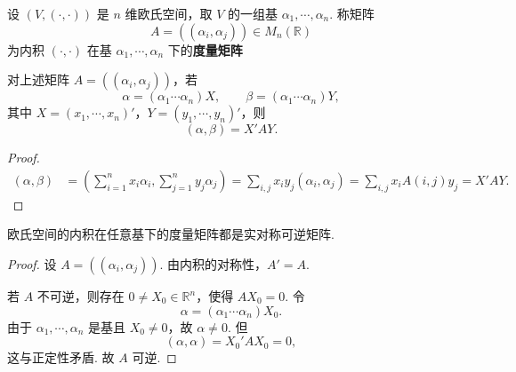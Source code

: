 \begin{definition}
	设 $(V,(\cdot,\cdot))$ 是 $n$ 维欧氏空间，取 $V$ 的一组基 $\alpha_1,\cdots,\alpha_n$. 称矩阵
	\[
	A=((\alpha_i,\alpha_j))\in M_n(\mathbb{R})
	\]
	为内积 $(\cdot,\cdot)$ 在基 $\alpha_1,\cdots,\alpha_n$ 下的\textbf{度量矩阵}
\end{definition}

\begin{lemma}
	对上述矩阵 $A=((\alpha_i,\alpha_j))$，若
	\[
	\alpha=(\alpha_1\cdots\alpha_n)X,
	\qquad
	\beta=(\alpha_1\cdots\alpha_n)Y,
	\]
	其中 $X=(x_1,\cdots,x_n)'$，$Y=(y_1,\cdots,y_n)'$，则
	\[
	(\alpha,\beta)=X'AY.
	\]
\end{lemma}
\begin{proof}

	\[
	\begin{aligned}
		(\alpha,\beta)
		&=\left(\sum_{i=1}^n x_i\alpha_i,\sum_{j=1}^n y_j\alpha_j\right)             =\sum_{i,j}x_i y_j(\alpha_i,\alpha_j)         =\sum_{i,j}x_iA(i,j)y_j=X'AY.
	\end{aligned}
	\]
\end{proof}

\begin{proposition}
	欧氏空间的内积在任意基下的度量矩阵都是实对称可逆矩阵.
\end{proposition}
\begin{proof}
	设 $A=((\alpha_i,\alpha_j))$. 由内积的对称性，$A'=A$.
	
	若 $A$ 不可逆，则存在 $0\ne X_0\in\mathbb{R}^n$，使得 $AX_0=0$. 令
	\[
	\alpha=(\alpha_1\cdots\alpha_n)X_0.
	\]
	由于 $\alpha_1,\cdots,\alpha_n$ 是基且 $X_0\ne0$，故 $\alpha\ne0$. 但
	\[
	(\alpha,\alpha)=X_0'AX_0=0,
	\]
	这与正定性矛盾. 故 $A$ 可逆.
\end{proof}

